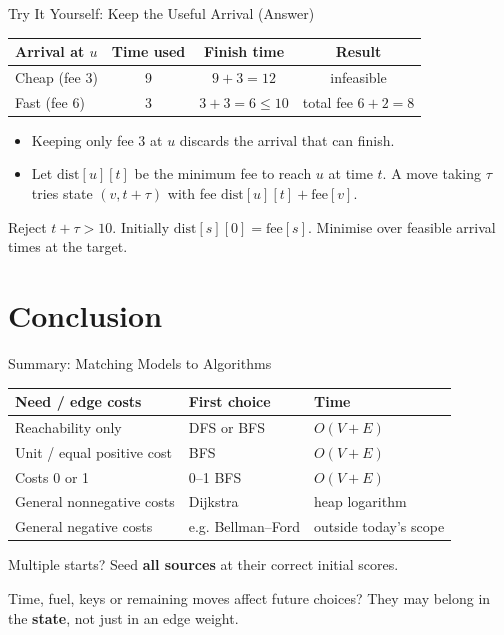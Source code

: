 \documentclass{beamer}
\begin{document}
\begin{frame}{Try It Yourself: Keep the Useful Arrival (Answer)}
  \begin{center}
  \small
  \begin{tabular}{@{}lccc@{}}
    \toprule
    Arrival at $u$ & Time used & Finish time & Result \\
    \midrule
    Cheap (fee 3) & 9 & $9+3=12$ & infeasible \\
    Fast (fee 6) & 3 & $3+3=6\le10$ & total fee $6+2=\boxed{8}$ \\
    \bottomrule
  \end{tabular}
  \end{center}
  \medskip
  \begin{itemize}
    \item Keeping only fee 3 at $u$ discards the arrival that can finish.
    \item Let $\mathrm{dist}[u][t]$ be the minimum fee to reach $u$ at time $t$.
      A move taking $\tau$ tries state $(v,t+\tau)$ with fee $\mathrm{dist}[u][t]+\mathrm{fee}[v]$.
  \end{itemize}
  Reject $t+\tau>10$. Initially $\mathrm{dist}[s][0]=\mathrm{fee}[s]$.
  Minimise over feasible arrival times at the target.
\end{frame}

\section{Conclusion}

\begin{frame}{Summary: Matching Models to Algorithms}
  \centering
  {\small
  \begin{tabular}{lll}
    \toprule
    \textbf{Need / edge costs} & \textbf{First choice} & \textbf{Time} \\
    \midrule
    Reachability only & DFS or BFS & $O(V+E)$ \\
    Unit / equal positive cost & BFS & $O(V+E)$ \\
    Costs 0 or 1 & 0--1 BFS & $O(V+E)$ \\
    General nonnegative costs & Dijkstra & heap logarithm \\
    General negative costs & e.g. Bellman--Ford & outside today's scope \\
    \bottomrule
  \end{tabular}}
  \medskip
  Multiple starts? Seed \textbf{all sources} at their correct initial scores.

  Time, fuel, keys or remaining moves affect future choices?
  They may belong in the \textbf{state}, not just in an edge weight.
\end{frame}
\end{document}
